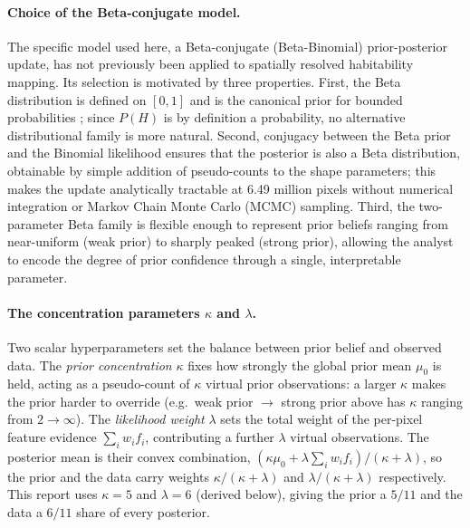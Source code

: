 \paragraph{Choice of the Beta-conjugate model.}
The specific model used here, a Beta-conjugate (Beta-Binomial) prior-posterior update, has not previously been applied to spatially resolved habitability mapping.  Its selection is motivated by three properties.  First, the Beta distribution is defined on $[0,1]$ and is the canonical prior for bounded probabilities \citep[ch.~2]{Gelman2013}; since $P(H)$ is by definition a probability, no alternative distributional family is more natural.  Second, conjugacy between the Beta prior and the Binomial likelihood ensures that the posterior is also a Beta distribution, obtainable by simple addition of pseudo-counts to the shape parameters; this makes the update analytically tractable at 6.49 million pixels without numerical integration or Markov Chain Monte Carlo (MCMC) sampling.  Third, the two-parameter Beta family is flexible enough to represent prior beliefs ranging from near-uniform (weak prior) to sharply peaked (strong prior), allowing the analyst to encode the degree of prior confidence through a single, interpretable parameter.

\paragraph{The concentration parameters $\kappa$ and $\lambda$.}
Two scalar hyperparameters set the balance between prior belief and observed data.  The \textit{prior concentration} $\kappa$ fixes how strongly the global prior mean $\mu_0$ is held, acting as a pseudo-count of $\kappa$ virtual prior observations: a larger $\kappa$ makes the prior harder to override (e.g.\ weak prior $\to$ strong prior above has $\kappa$ ranging from $2 \to \infty$).  The \textit{likelihood weight} $\lambda$ sets the total weight of the per-pixel feature evidence $\sum_i w_i f_i$, contributing a further $\lambda$ virtual observations.  The posterior mean is their convex combination, $(\kappa\mu_0 + \lambda\sum_i w_i f_i)/(\kappa + \lambda)$, so the prior and the data carry weights $\kappa/(\kappa+\lambda)$ and $\lambda/(\kappa+\lambda)$ respectively.  This report uses $\kappa = 5$ and $\lambda = 6$ (derived below), giving the prior a $5/11$ and the data a $6/11$ share of every posterior.

